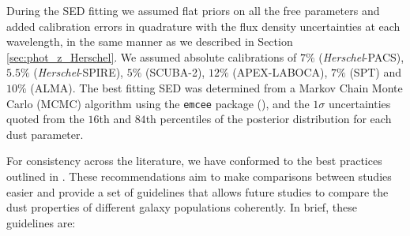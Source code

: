 During the SED fitting we assumed flat priors on all the free parameters and added calibration errors in quadrature with the flux density uncertainties at each wavelength, in the same manner as we described in Section \ref{sec:phot_z_Herschel}. We assumed absolute calibrations of $7\%$ (\textit{Herschel}-PACS), $5.5\%$ (\textit{Herschel}-SPIRE), $5\%$ (SCUBA-2), $12\%$ (APEX-LABOCA), $7\%$ (SPT) and $10\%$ (ALMA). The best fitting SED was determined from a Markov Chain Monte Carlo (MCMC) algorithm using the \texttt{emcee} package (\citealt{Foreman-Mackey_2013}), and the $1\sigma$ uncertainties quoted from the $16$th and $84$th percentiles of the posterior distribution for each dust parameter.

For consistency across the literature, we have conformed to the best practices outlined in \citealt{Drew_2022}. These recommendations aim to make comparisons between studies easier and provide a set of guidelines that allows future studies to compare the dust properties of different galaxy populations coherently. In brief, these guidelines are: 


